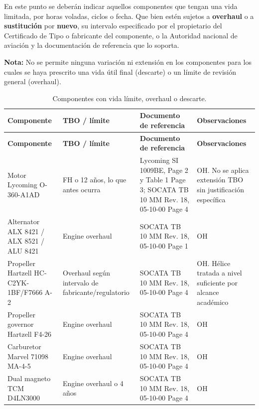 \documentclass[12pt]{article}
\newcommand{\FH}{FH}
\begin{document}
En este punto se deberán indicar aquellos componentes que tengan una vida limitada, por horas voladas, ciclos o fecha. Que bien estén sujetos a \textbf{overhaul} o a \textbf{sustitución} por \textbf{nuevo}, su intervalo especificado por el propietario del Certificado de Tipo o fabricante del componente, o la Autoridad nacional de aviación y la documentación de referencia que lo soporta.

\noindent\textbf{Nota:} No se permite ninguna variación ni extensión en los componentes para los cuales se haya prescrito una vida útil final (descarte) o un límite de revisión general (overhaul).

\begingroup
\scriptsize
\setlength{\tabcolsep}{3pt}
\renewcommand{\arraystretch}{1.18}
\begin{longtable}{|>{\raggedright\arraybackslash}p{}|>{\raggedright\arraybackslash}p{}|>{\raggedright\arraybackslash}p{}|>{\raggedright\arraybackslash}p{}|}
\caption{Componentes con vida límite, overhaul o descarte.}
\label{tab:componentes-vida-limite}\\
\hline
\textbf{Componente} & \textbf{TBO / límite} & \textbf{Documento de referencia} & \textbf{Observaciones} \\
\hline
\endfirsthead
\hline
\textbf{Componente} & \textbf{TBO / límite} & \textbf{Documento de referencia} & \textbf{Observaciones} \\
\hline
\endhead
Motor Lycoming O-360-A1AD & 2000 \FH{} o 12 años, lo que antes ocurra & Lycoming SI 1009BE, Page 2 y Table 1 Page 3; SOCATA TB 10 MM Rev. 18, 05-10-00 Page 4 & OH. No se aplica extensión TBO sin justificación específica \\
\hline
Alternator ALX 8421 / ALX 8521 / ALU 8421 & Engine overhaul & SOCATA TB 10 MM Rev. 18, 05-10-00 Page 1 & OH \\
\hline
Propeller Hartzell HC-C2YK-1BF/F7666 A-2 & Overhaul según intervalo de fabricante/regulatorio & SOCATA TB 10 MM Rev. 18, 05-10-00 Page 4 & OH. Hélice tratada a nivel suficiente por alcance académico \\
\hline
Propeller governor Hartzell F4-26 & Engine overhaul & SOCATA TB 10 MM Rev. 18, 05-10-00 Page 4 & OH \\
\hline
Carburetor Marvel 71098 MA-4-5 & Engine overhaul & SOCATA TB 10 MM Rev. 18, 05-10-00 Page 4 & OH \\
\hline
Dual magneto TCM D4LN3000 & Engine overhaul o 4 años & SOCATA TB 10 MM Rev. 18, 05-10-00 Page 4 & OH \\

\end{longtable}
\end{document}
